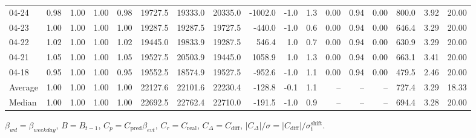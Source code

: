 \begin{threeparttable}
{\begin{tabular}{lrrrrrrrrrrrrrrrr}
  04-24 &         0.98 &           1.00 &          1.00 &          0.98 & 19727.5 & 19333.0 & 20335.0 &    -1002.0 &                     -1.0 &                 1.3 &       0.00 &      0.94 &           0.00 &            800.0 &            3.92 &                  20.00 \\
  04-23 &         1.00 &           1.00 &          1.00 &          1.00 & 19287.5 & 19287.5 & 19727.5 &     -440.0 &                     -1.0 &                 0.6 &       0.00 &      0.94 &           0.00 &            646.4 &            3.29 &                  20.00 \\
  04-22 &         1.02 &           1.00 &          1.00 &          1.02 & 19445.0 & 19833.9 & 19287.5 &      546.4 &                      1.0 &                 0.7 &       0.00 &      0.94 &           0.00 &            630.9 &            3.29 &                  20.00 \\
  04-21 &         1.05 &           1.00 &          1.00 &          1.05 & 19527.5 & 20503.9 & 19445.0 &     1058.9 &                      1.0 &                 1.3 &       0.00 &      0.94 &           0.00 &            663.1 &            3.41 &                  20.00 \\
  04-18 &         0.95 &           1.00 &          1.00 &          0.95 & 19552.5 & 18574.9 & 19527.5 &     -952.6 &                     -1.0 &                 1.1 &       0.00 &      0.94 &           0.00 &            479.5 &            2.46 &                  20.00 \\
Average &         1.00 &           1.00 &          1.00 &          1.00 & 22127.6 & 22101.6 & 22230.4 &     -128.8 &                     -0.1 &                 1.1 &         -- &        -- &             -- &            727.4 &            3.29 &                  18.33 \\
 Median &         1.00 &           1.00 &          1.00 &          1.00 & 22692.5 & 22762.4 & 22710.0 &     -191.5 &                     -1.0 &                 0.9 &         -- &        -- &             -- &            694.4 &            3.28 &                  20.00 \\
\bottomrule
\end{tabular}
}
\begin{tablenotes}\footnotesize
\item $\beta_{wd}=\beta_{weekday}$, $B=B_{t-1}$,
$C_p=C_{\text{pred}}\beta_{evt}$, $C_r=C_{\text{real}}$,
$C_\Delta=C_{\text{diff}}$, $|C_\Delta|/\sigma=|C_{\text{diff}}|/\sigma_t^{\text{shift}}$.
\end{tablenotes}
\end{threeparttable}
\endgroup
